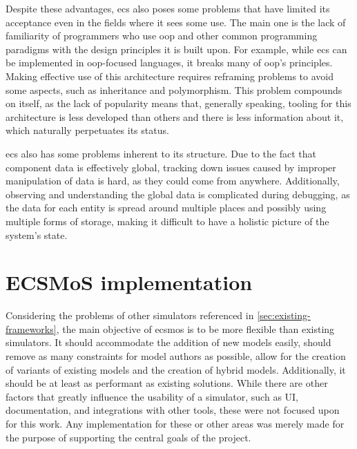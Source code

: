 \documentclass[twoside, 11pt]{article}
\begin{document}
Despite these advantages, \gls{ecs} also poses some problems that have limited its acceptance even in the fields where it sees some use. The main one is the lack of familiarity of programmers who use \gls{oop} and other common programming paradigms with the design principles it is built upon. For example, while \gls{ecs} can be implemented in \gls{oop}-focused languages, it breaks many of \gls{oop}'s principles. Making effective use of this architecture requires reframing problems to avoid some aspects, such as inheritance and polymorphism. This problem compounds on itself, as the lack of popularity means that, generally speaking, tooling for this architecture is less developed than others and there is less information about it, which naturally perpetuates its status.

\gls{ecs} also has some problems inherent to its structure. Due to the fact that component data is effectively global, tracking down issues caused by improper manipulation of data is hard, as they could come from anywhere. Additionally, observing and understanding the global data is complicated during debugging, as the data for each entity is spread around multiple places and possibly using multiple forms of storage, making it difficult to have a holistic picture of the system's state.


\section{ECSMoS implementation} \label{sec:ecsmos-implementation}

Considering the problems of other simulators referenced in \autoref{sec:existing-frameworks}, the main objective of \gls{ecsmos} is to be more flexible than existing simulators. It should accommodate the addition of new models easily, should remove as many constraints for model authors as possible, allow for the creation of variants of existing models and the creation of hybrid models. Additionally, it should be at least as performant as existing solutions. While there are other factors that greatly influence the usability of a simulator, such as UI, documentation, and integrations with other tools, these were not focused upon for this work. Any implementation for these or other areas was merely made for the purpose of supporting the central goals of the project.
\end{document}
